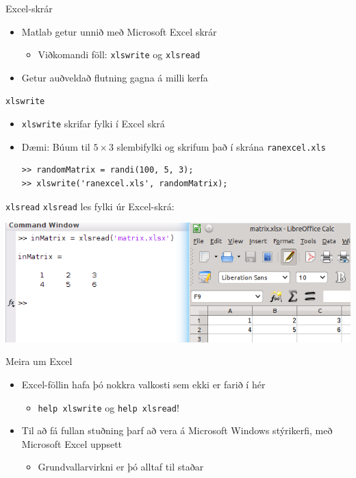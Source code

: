 \documentclass{beamer}
\begin{document}
\begin{frame}{Excel-skrár}
\begin{itemize}
 \item Matlab getur unnið með Microsoft Excel skrár
 \begin{itemize}
  \item Viðkomandi föll: \texttt{xlswrite} og \texttt{xlsread}
 \end{itemize}
 \item Getur auðveldað flutning gagna á milli kerfa
\end{itemize}
\end{frame}

\begin{frame}[fragile]{\texttt{xlswrite}}
\begin{itemize}
 \item \texttt{xlswrite} skrifar fylki í Excel skrá
 \item Dæmi: Búum til $5 \times 3$ slembifylki og skrifum það í skrána \texttt{ranexcel.xls}
\begin{verbatim}
>> randomMatrix = randi(100, 5, 3); 
>> xlswrite('ranexcel.xls', randomMatrix); 
\end{verbatim}
\end{itemize}
\end{frame}

\begin{frame}[fragile]{\texttt{xlsread}}
\texttt{xlsread} les fylki úr Excel-skrá:

\includegraphics[width=\textwidth]{Pics/excel}

\end{frame}

\begin{frame}{Meira um Excel}
\begin{itemize}
 \item Excel-föllin hafa þó nokkra valkosti sem ekki er farið í hér
 \begin{itemize}
  \item \texttt{help xlswrite} og \texttt{help xlsread}!
 \end{itemize}
 \item Til að fá fullan stuðning þarf að vera á Microsoft Windows stýrikerfi, með Microsoft Excel uppsett
 \begin{itemize}
  \item Grundvallarvirkni er þó alltaf til staðar
 \end{itemize}
\end{itemize}
\end{frame}
\end{document}
